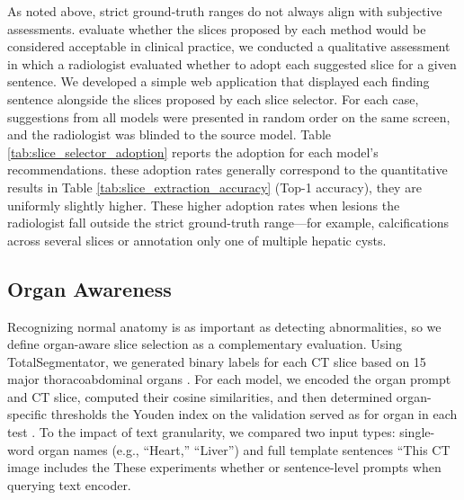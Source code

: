 \documentclass[bioengineering,article,submit,pdftex,moreauthors]{Definitions/mdpi}
\begin{document}
As noted above, strict ground-truth ranges do not always align with  subjective assessments.
 evaluate whether the slices proposed by each method would be considered acceptable in clinical practice, we conducted a qualitative assessment in which a radiologist evaluated whether to adopt each suggested slice for a given sentence. 
We developed a simple web application that displayed each finding sentence alongside the slices proposed by each slice selector. 
For each case, suggestions from all models were presented in random order on the same screen, and the radiologist was blinded to the source model. 
Table \ref{tab:slice_selector_adoption} reports the adoption  for each model’s recommendations. 
 these adoption rates generally correspond to the quantitative results  in Table \ref{tab:slice_extraction_accuracy} (Top-1 accuracy), they are uniformly slightly higher. 
These higher adoption rates  when lesions  the radiologist fall outside the strict ground-truth range—for example, calcifications  across several slices or annotation  only one of multiple hepatic cysts.


\subsection{Organ Awareness}\label{sec:organ_aware}
Recognizing normal anatomy is as important as detecting abnormalities, so we deﬁne organ-aware slice selection as a complementary evaluation. 
Using TotalSegmentator, we generated binary  labels for each CT slice based on 15 major thoracoabdominal organs \cite{wasserthal_totalsegmentator_2023}. 
For each model, we encoded the organ prompt and  CT slice, computed their cosine similarities, and then determined organ-specific thresholds  the Youden index on the validation   served as  for  organ  in each test  \cite{youden_index_1950}. 
To  the impact of text granularity, we compared two input types: single-word organ names (e.g., “Heart,” “Liver”) and full template sentences  “This CT image includes the These experiments  whether  or sentence-level prompts when querying  text encoder. 
\end{document}
